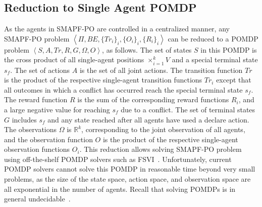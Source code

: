 \documentclass[letterpaper]{article} %
\newcommand{\tuple}[1]{\ensuremath{\left \langle #1 \right \rangle }}
\begin{document}
\subsection{Reduction to Single Agent POMDP}
\label{sec:reduction}
As the agents in SMAPF-PO are controlled in a centralized manner, any SMAPF-PO problem $\tuple{\Pi,BE,\{Tr_i\}_i, \{O_i\}_i, \{R_i\}_i}$ can be reduced to a POMDP problem $\tuple{S,A,Tr,R,G,\Omega,O}$, as follows.
The set of states $S$ in this POMDP
is the cross product of all single-agent positions $\times_{i=1}^k V$ and a special terminal state $s_f$.
The set of actions $A$ is the set of all joint actions.
The transition function $Tr$ is the product of the respective single-agent transition functions $Tr_i$ except that all outcomes in which a conflict has occurred reach the special terminal state $s_f$.
The reward function $R$ is the sum of the corresponding reward functions $R_i$, and a large negative value for reaching $s_f$ due to a conflict.
The set of terminal states $G$ includes $s_f$ and any state reached after all agents have used a declare action.
The observations $\Omega$ is $\mathbb{R}^k$, corresponding to the joint observation of all agents, and the observation function $O$ is the product of the respective single-agent observation functions $O_i$.
This reduction allows solving SMAPF-PO problem using off-the-shelf POMDP solvers such as FSVI~\cite{shani2007forward}.
Unfortunately, current POMDP solvers cannot solve this POMDP in reasonable time beyond very small problems, as the size of the state space, action space, and observation space are all exponential in the number of agents. Recall that solving POMDPs is in general undecidable~\cite{madani2003undecidability}. %
\end{document}
